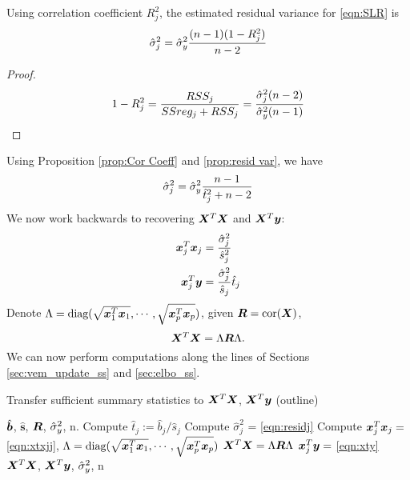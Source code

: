 \begin{proposition} \label{prop:resid var}
Using correlation coefficient $R^2_j$, the estimated residual variance for \eqref{eqn:SLR} is
\begin{equation}
    \hat{\sigma}_{j}^2 = \hat{\sigma}_y^2\frac{(n-1)(1-R_{j}^2)}{n-2} \label{eqn:sigma2hat}
\end{equation}
\end{proposition}
\begin{proof}
\begin{equation}
    1-R_{j}^{2} = \frac{RSS_j}{SSreg_j + RSS_j} = \frac{\hat{\sigma}_{j}^2(n-2)}{\hat{\sigma}_y^2(n-1)}
\end{equation}
\end{proof}
Using Proposition \ref{prop:Cor Coeff} and \ref{prop:resid var}, we have 
\begin{equation}\label{eqn:residj}
    \hat{\sigma}_{j}^2 = \hat{\sigma}_y^2 \frac{n-1}{\hat{t}_{j}^2+n-2}
\end{equation}
We now work backwards to recovering $\bm X^T\bm X$ and $\bm X^T\bm y$:
\begin{align}
    \bm x_j^{T}\bm x_j &= \frac{\hat{\sigma}_{j}^2}{\hat{s}_{j}^{2}} \label{eqn:xtxjj} \\
    \bm x_j^{T}\bm y &= \frac{\hat{\sigma}_{j}^2}{\hat{s}_{j}} \hat{t}_{j} \label{eqn:xty}
\end{align}
Denote $\Lambda = \text{diag}(\sqrt{\bm x_1^{T}\bm x_1}, \cdots, \sqrt{\bm x_p^{T}\bm x_p})$, given $\bm R = \text{cor}(\bm X)$,
\begin{equation}\label{eqn:xtx}
    \bm X^T \bm X = \Lambda \bm R \Lambda.
\end{equation}
We can now perform \susie computations along the lines of Sections \ref{sec:vem_update_ss} and \ref{sec:elbo_ss}.

\begin{algorithm}[H] 
\caption{Transfer sufficient summary statistics to $\bm X^T \bm X$, $\bm X^T \bm y$ (outline)} \label{alg:ss suff interface}
\begin{algorithmic}[1]
\Require $\hat{\bm b}$, $\hat{\bm{s}}$, $\bm R$, $\hat{\sigma}_y^2$, n.
\State Compute $\hat{t}_j := \hat{b}_{j} / \hat{s}_j $
\State Compute $\hat{\sigma}_{j}^2$ = \eqref{eqn:residj}
\State Compute $\bm x_j^{T}\bm x_j = $ \eqref{eqn:xtxjj}, $\Lambda = \text{diag}(\sqrt{\bm x_1^{T}\bm x_1}, \cdots, \sqrt{\bm x_p^{T}\bm x_p})$
\State $\bm X^T \bm X = \Lambda \bm R \Lambda$
\State $\bm x_j^{T}\bm y = $ \eqref{eqn:xty} \\
\Return $\bm X^T \bm X$, $\bm X^{T}\bm y$, $\hat{\sigma}_y^2$, n
\end{algorithmic}
\end{algorithm}

